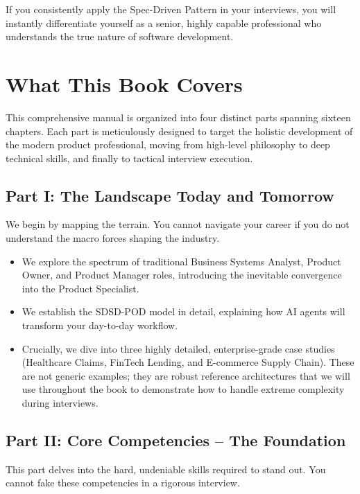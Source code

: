 \documentclass[
  11pt,
  openany,
  oneside]{book}
\providecommand{\tightlist}{%
  \setlength{\itemsep}{0pt}\setlength{\parskip}{0pt}}
\begin{document}
If you consistently apply the Spec-Driven Pattern in your interviews,
you will instantly differentiate yourself as a senior, highly capable
professional who understands the true nature of software development.

\section{What This Book Covers}\label{what-this-book-covers}

This comprehensive manual is organized into four distinct parts spanning
sixteen chapters. Each part is meticulously designed to target the
holistic development of the modern product professional, moving from
high-level philosophy to deep technical skills, and finally to tactical
interview execution.

\subsection{Part I: The Landscape Today and
Tomorrow}\label{part-i-the-landscape-today-and-tomorrow}

We begin by mapping the terrain. You cannot navigate your career if you
do not understand the macro forces shaping the industry.

\begin{itemize}
\tightlist
\item
  We explore the spectrum of traditional Business Systems Analyst,
  Product Owner, and Product Manager roles, introducing the inevitable
  convergence into the Product Specialist.
\item
  We establish the SDSD-POD model in detail, explaining how AI agents
  will transform your day-to-day workflow.
\item
  Crucially, we dive into three highly detailed, enterprise-grade case
  studies (Healthcare Claims, FinTech Lending, and E-commerce Supply
  Chain). These are not generic examples; they are robust reference
  architectures that we will use throughout the book to demonstrate how
  to handle extreme complexity during interviews.
\end{itemize}

\subsection{Part II: Core Competencies -- The
Foundation}\label{part-ii-core-competencies-the-foundation}

This part delves into the hard, undeniable skills required to stand out.
You cannot fake these competencies in a rigorous interview.
\end{document}
